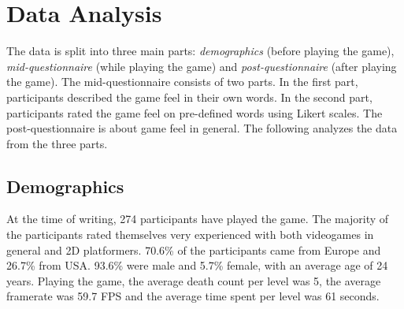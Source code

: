 \section{Data Analysis} \label{data}
The data is split into three main parts: \textit{demographics} (before playing the game), \textit{mid-questionnaire} (while playing the game) and \textit{post-questionnaire} (after playing the game). The mid-questionnaire consists of two parts. In the first part, participants described the game feel in their own words. In the second part, participants rated the game feel on pre-defined words using Likert scales. The post-questionnaire is about game feel in general. The following analyzes the data from the three parts.

\subsection{Demographics}
At the time of writing, 274 participants have played the game. The majority of the participants rated themselves very experienced with both videogames in general and 2D platformers. 70.6\% of the participants came from Europe and 26.7\% from USA. 93.6\% were male and 5.7\% female, with an average age of 24 years. Playing the game, the average death count per level was 5, the average framerate was 59.7 FPS and the average time spent per level was 61 seconds.


